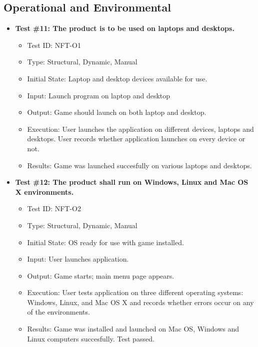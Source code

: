 \documentclass[12pt, titlepage]{article}
\begin{document}
\subsection{Operational and Environmental}
\begin{itemize}
\item \textbf{Test \#11: The product is to be used on laptops and desktops.}
\begin{itemize}
\item Test ID: NFT-O1
\item Type: Structural, Dynamic, Manual				
\item Initial State: Laptop and desktop devices available for use.		
\item Input: Launch program on laptop and desktop
\item Output: Game should launch on both laptop and desktop.		
\item Execution: User launches the application on different devices, laptops and desktops. User records whether application launches on every device or not.
\item Results: Game was launched succesfully on various laptops and desktops.
\end{itemize}

\item \textbf{Test \#12: The product shall run on Windows, Linux and Mac OS X environments.}
\begin{itemize}
\item Test ID: NFT-O2
\item Type: Structural, Dynamic, Manual			
\item Initial State: OS ready for use with game installed.		
\item Input: User launches application.			
\item Output: Game starts; main menu page appears.				
\item Execution: User tests application on three different operating systems: Windows, Linux, and Mac OS X and records whether errors occur on any of the environments.
\item Results: Game was installed and launched on Mac OS, Windows and Linux computers succesfully. Test passed.
\end{itemize}
\end{itemize}
\end{document}
